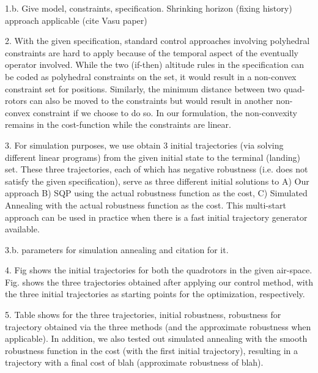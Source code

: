1.b. Give model, constraints, specification. Shrinking horizon (fixing history) approach applicable (cite Vasu paper)

2. With the given specification, standard control approaches involving polyhedral constraints are hard to apply because of the temporal aspect of the eventually operator involved. While the two (if-then) altitude rules in the specification can be coded as polyhedral constraints on the set, it would result in a non-convex constraint set for positions. Similarly, the minimum distance between two quad-rotors can also be moved to the constraints but would result in another non-convex constraint if we choose to do so. In our formulation, the non-convexity remains in the cost-function while the constraints are linear.

3. For simulation purposes, we use obtain 3 initial trajectories (via solving different linear programs) from the given initial state to the terminal (landing) set. These three trajectories, each of which has negative robustness (i.e. does not satisfy the given specification), serve as three different initial solutions to A) Our approach B) SQP using the actual robustness function as the cost, C) Simulated Annealing with the actual robustness function as the cost. This multi-start approach can be used in practice when there is a fast initial trajectory generator available.

3.b. parameters for simulation annealing and citation for it.

4. Fig shows the initial trajectories for both the quadrotors in the given air-space. Fig. shows the three trajectories obtained after applying our control method, with the three initial trajectories as starting points for the optimization, respectively. 

5. Table shows for the three trajectories, initial robustness, robustness for trajectory obtained via the three methods (and the approximate robustness when applicable). In addition, we also tested out simulated annealing with the smooth robustness function in the cost (with the first initial trajectory), resulting in a trajectory with a final cost of blah (approximate robustness of blah).





